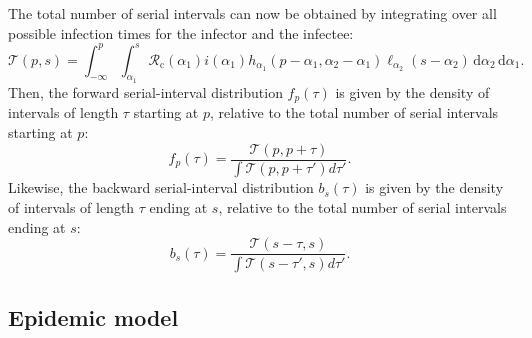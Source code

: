 \documentclass[12pt]{article}
\newcommand{\Rx}[1]{\ensuremath{{\mathcal R}_{#1}}\xspace}
\newcommand{\Rc}{\Rx{\mathrm{c}}}
\newcommand{\psymp}{\ensuremath{p}} %
\newcommand{\ssymp}{\ensuremath{s}} %
\newcommand{\pinf}{\ensuremath{\alpha_1}} %
\newcommand{\sinf}{\ensuremath{\alpha_2}} %
\newcommand{\idist}{\ell} %
\newcommand{\total}{{\mathcal T}} %
\begin{document}
The total number of serial intervals can now be obtained by integrating over all possible infection times for the infector and the infectee:
\begin{equation}
\total (\psymp,\ssymp) = \int_{-\infty}^{\psymp} \int_{\pinf}^{\ssymp} \Rc (\pinf) i(\pinf) h_{\pinf}(\psymp-\pinf, \sinf - \pinf) \idist_{\sinf}(\ssymp - \sinf) \, \mathrm{d}\sinf\,\mathrm{d}\pinf.
\end{equation}
Then, the forward serial-interval distribution $f_\psymp(\tau)$ is given by the density of intervals of length $\tau$ starting at \psymp, relative to the total number of serial intervals starting at \psymp: 
\begin{equation}
f_\psymp(\tau) = 
\frac{\total(\psymp, \psymp+\tau)}{\int \total(\psymp, \psymp+\tau') d\tau'}.
\end{equation}
Likewise, the backward serial-interval distribution $b_\ssymp(\tau)$ is given by the density of intervals of length $\tau$ ending at \ssymp, relative to the total number of serial intervals ending at \ssymp: 
\begin{equation}
b_\ssymp(\tau) = 
\frac{\total(\ssymp-\tau, \ssymp)}{\int \total(\ssymp-\tau', \ssymp) d\tau'}.
\end{equation}

\subsection{Epidemic model}
\end{document}
